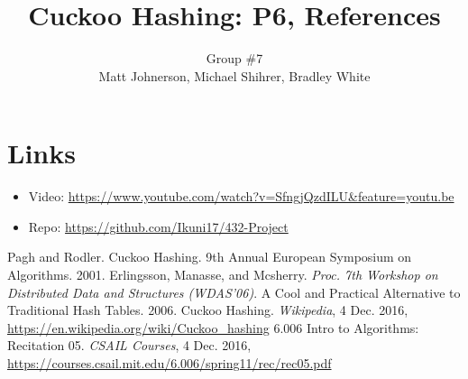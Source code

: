\documentclass[11pt]{article}
\title{Cuckoo Hashing: P6, References}
\author{Group \#7 \\ 
\small{Matt Johnerson, Michael Shihrer, Bradley White}}
\begin{document}
\maketitle

\section*{Links}
\begin{itemize}
\item Video: \url{https://www.youtube.com/watch?v=SfngjQzdILU&feature=youtu.be}
\item Repo: \url{https://github.com/Ikuni17/432-Project}
\end{itemize}

\begin{thebibliography}{9}
Pagh and Rodler.
Cuckoo Hashing.
9th Annual European Symposium on Algorithms.
2001.
Erlingsson, Manasse, and Mcsherry.
\textit{Proc. 7th Workshop on Distributed Data and Structures (WDAS'06)}.
A Cool and Practical Alternative to Traditional Hash Tables.
2006.
Cuckoo Hashing.
\textit{Wikipedia}, 4 Dec. 2016,
\url{https://en.wikipedia.org/wiki/Cuckoo_hashing}
6.006 Intro to Algorithms: Recitation 05.
\textit{CSAIL Courses}, 4 Dec. 2016,
\url{https://courses.csail.mit.edu/6.006/spring11/rec/rec05.pdf}
\end{thebibliography}
\end{document}
